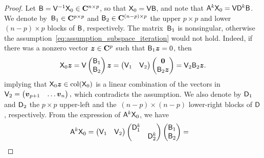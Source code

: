 \begin{proof}
    Let $\mathsf B = \mathsf V^{-1} \mathsf X_0 \in \mathbf C^{n \times p}$, so that $\mathsf X_0 = \mathsf V \mathsf B$,
    and note that $\mathsf A^k \mathsf X_0 = \mathsf V \mathsf D^k \mathsf B$.
    We denote by~$\mathsf B_1 \in \mathbf C^{p \times p}$ and $\mathsf B_2 \in \mathbf C^{(n-p) \times p}$ the upper $p \times p$ and lower $(n-p) \times p$ blocks of $\mathsf B$,
    respectively.
    The matrix~$\mathsf B_1$ is nonsingular,
    otherwise the assumption~\eqref{eq:assumption_subspace_iteration} would not hold.
    Indeed, if there was a nonzero vector $\mathbf{\boldsymbol{z}} \in \mathbf C^p$ such that $\mathsf B_1 \mathbf{\boldsymbol{z}} = 0$,
    then
    \[
        \mathsf X_0
        \mathbf{\boldsymbol{z}}
        = \mathsf V
        \begin{pmatrix}
            \mathsf B_1 \\
            \mathsf B_2
        \end{pmatrix}
        \mathbf{\boldsymbol{z}}
        =
        \begin{pmatrix}
            \mathsf V_1
            & \mathsf V_2
        \end{pmatrix}
        \begin{pmatrix}
            \mathbf{\boldsymbol{0}} \\
            \mathsf B_2 \mathbf{\boldsymbol{z}}
        \end{pmatrix}
        = \mathsf V_2 \mathsf B_2 \mathbf{\boldsymbol{z}}.
    \]
    implying that $\mathsf X_0 \mathbf{\boldsymbol{z}} \in \operatorname{col}(\mathsf X_0)$ is a linear combination of the vectors in
    \(
        \mathsf V_2 =
        \begin{pmatrix}
            \mathbf{\boldsymbol{v}}_{p+1} & \hdots \mathbf{\boldsymbol{v}}_n
        \end{pmatrix},
    \)
    which contradicts the assumption.
    We also denote by $\mathsf D_1$ and $\mathsf D_2$ the $p \times p$ upper-left and the~$(n-p) \times (n-p)$ lower-right blocks of $\mathsf D$, respectively.
    From the expression of $\mathsf A^k \mathsf X_0$,
    we have
    \begin{align}
        \notag
        \mat A^k \mat X_0
        &= \begin{pmatrix} \mat V_1 & \mat V_2 \end{pmatrix}
        \begin{pmatrix}
            \mat D_1^k & \\
                       & \mat D_2^k
        \end{pmatrix}
        \begin{pmatrix}
            \mat B_1 \\ \mat B_2
        \end{pmatrix}
        =

\end{align}
\end{proof}
